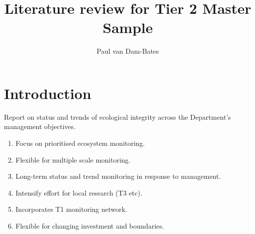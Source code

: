 \documentclass[12pt]{article}
\title{ Literature review for Tier 2 Master Sample }
\author{Paul van Dam-Bates}
\begin{document}
\maketitle
\section{Introduction}
Report on status and trends of ecological integrity across the Department's management objectives.
\begin{enumerate}
	\item Focus on prioritised ecosystem monitoring.
	\item Flexible for multiple scale monitoring.
	\item Long-term status and trend monitoring in response to management.
	\item Intensify effort for local research (T3 etc).
	\item Incorporates T1 monitoring network.
	\item Flexible for changing investment and boundaries.
\end{enumerate}

\section{}


	
\end{document}
